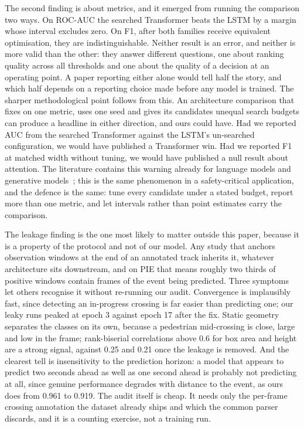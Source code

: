\documentclass[mti,article,submit,moreauthors]{Definitions/mdpi}
\begin{document}
The second finding is about metrics, and it emerged from running the comparison two ways. On ROC-AUC the searched Transformer beats the LSTM by a margin whose interval excludes zero. On F1, after both families receive equivalent optimisation, they are indistinguishable. Neither result is an error, and neither is more valid than the other: they answer different questions, one about ranking quality across all thresholds and one about the quality of a decision at an operating point. A paper reporting either alone would tell half the story, and which half depends on a reporting choice made before any model is trained. The sharper methodological point follows from this. An architecture comparison that fixes on one metric, uses one seed and gives its candidates unequal search budgets can produce a headline in either direction, and ours could have. Had we reported AUC from the searched Transformer against the LSTM's un-searched configuration, we would have published a Transformer win. Had we reported F1 at matched width without tuning, we would have published a null result about attention. The literature contains this warning already for language models and generative models~\citep{melis2018sota,lucic2018gans}; this is the same phenomenon in a safety-critical application, and the defence is the same: tune every candidate under a stated budget, report more than one metric, and let intervals rather than point estimates carry the comparison.

The leakage finding is the one most likely to matter outside this paper, because it is a property of the protocol and not of our model. Any study that anchors observation windows at the end of an annotated track inherits it, whatever architecture sits downstream, and on PIE that means roughly two thirds of positive windows contain frames of the event being predicted. Three symptoms let others recognise it without re-running our audit. Convergence is implausibly fast, since detecting an in-progress crossing is far easier than predicting one; our leaky runs peaked at epoch 3 against epoch 17 after the fix. Static geometry separates the classes on its own, because a pedestrian mid-crossing is close, large and low in the frame; rank-biserial correlations above 0.6 for box area and height are a strong signal, against 0.25 and 0.21 once the leakage is removed. And the clearest tell is insensitivity to the prediction horizon: a model that appears to predict two seconds ahead as well as one second ahead is probably not predicting at all, since genuine performance degrades with distance to the event, as ours does from 0.961 to 0.919. The audit itself is cheap. It needs only the per-frame crossing annotation the dataset already ships and which the common parser discards, and it is a counting exercise, not a training run.
\end{document}
